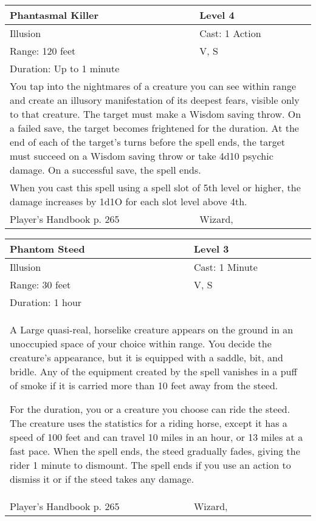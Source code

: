 \documentclass[11pt]{report}
\begin{document}
\begin{table}[H]
	\begin{tabular}{||p{6cm}|p{6cm}||}
		\hline\hline
		\bf{Phantasmal Killer} & Level 4\\ \hline
		Illusion & Cast: 1 Action\\ \hline
		Range: 120 feet & V, S\\ \hline
		Duration: Up to 1 minute & \\ \hline
		\multicolumn{2}{||p{12cm}||}{You tap into the nightmares of a creature you can see within range and create an illusory manifestation of its deepest fears, visible only to that creature.
The target must make a Wisdom saving throw. On a failed save, the target becomes frightened for the duration. At the end of each of the target’s turns before the spell ends, the target must succeed on a Wisdom saving throw or take 4d10 psychic damage. On a successful save, the spell ends.}\\ \hline
		\multicolumn{2}{||p{12cm}||}{When you cast this spell using a spell slot of 5th level or higher, the damage increases by 1d1O for each slot level above 4th.}\\ \hline
Player's Handbook p. 265 & Wizard, \\ \hline\hline
	\end{tabular}
\end{table}

\begin{table}[H]
	\begin{tabular}{||p{6cm}|p{6cm}||}
		\hline\hline
		\bf{Phantom Steed} & Level 3\\ \hline
		Illusion & Cast: 1 Minute\\ \hline
		Range: 30 feet & V, S\\ \hline
		Duration: 1 hour & \\ \hline
		\multicolumn{2}{||p{12cm}||}{A Large quasi-real, horselike creature appears on the ground in an unoccupied space of your choice within range. You decide the creature’s appearance, but it is equipped with a saddle, bit, and bridle. Any of the equipment created by the spell vanishes in a puff of smoke if it is carried more than 10 feet away from the steed.

For the duration, you or a creature you choose can ride the steed. The creature uses the statistics for a riding horse, except it has a speed of 100 feet and can travel 10 miles in an hour, or 13 miles at a fast pace. When the spell ends, the steed gradually fades, giving the rider 1 minute to dismount. The spell ends if you use an action to dismiss it or if the steed takes any damage.}\\ \hline
Player's Handbook p. 265 & Wizard, \\ \hline\hline
	\end{tabular}
\end{table}
\end{document}
